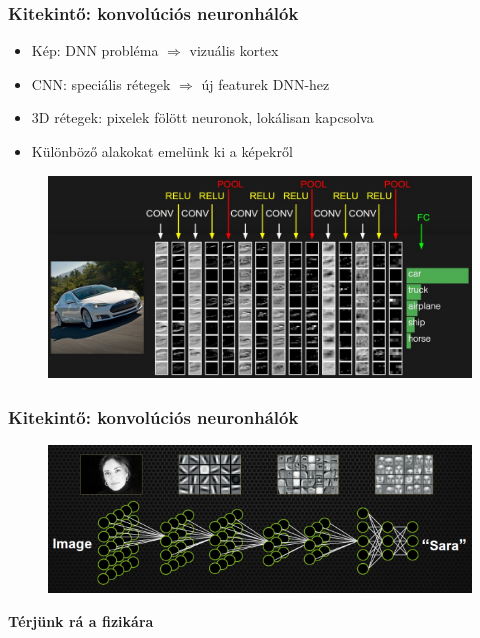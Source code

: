 \documentclass{beamer}
\begin{document}
\begin{frame}
\frametitle{Kitekintő: konvolúciós neuronhálók}

\begin{itemize}
  \setlength{\itemsep}{6pt}
  \item Kép: DNN probléma $\Rightarrow$ vizuális kortex
  \item CNN: speciális rétegek $\Rightarrow$ új featurek DNN-hez
  \item 3D rétegek: pixelek fölött neuronok, lokálisan kapcsolva
  \item Különböző alakokat emelünk ki a képekről
\end{itemize}

\begin{figure}[H]
	\centering
    	\includegraphics[width=\textwidth]{pic/cnn.jpeg}\\
\end{figure}
\end{frame}


\begin{frame}
\frametitle{Kitekintő: konvolúciós neuronhálók}
\begin{figure}[H]
	\centering
    	\includegraphics[width=\textwidth]{pic/cnn2}\\
\end{figure}
\end{frame}

\begin{frame}
\begin{center}
\textbf{\huge{Térjünk rá a fizikára}}
\end{center}
\end{frame}
\end{document}

